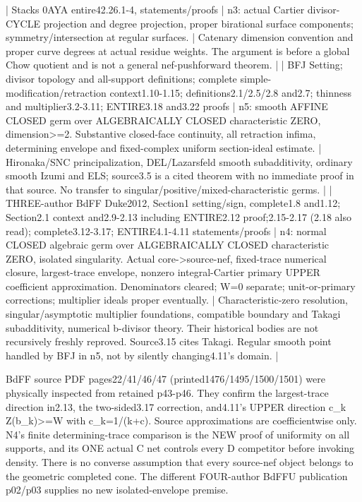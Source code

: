 \documentclass[11pt]{article}
\begin{document}
| Stacks 0AYA entire42.26.1-4, statements/proofs | n3: actual Cartier divisor-CYCLE projection and degree projection, proper birational surface components; symmetry/intersection at regular surfaces. | Catenary dimension convention and proper curve degrees at actual residue weights. The argument is before a global Chow quotient and is not a general nef-pushforward theorem. |
| BFJ Setting; divisor topology and all-support definitions; complete simple-modification/retraction context1.10-1.15; definitions2.1/2.5/2.8 and2.7; thinness and multiplier3.2-3.11; ENTIRE3.18 and3.22 proofs | n5: smooth AFFINE CLOSED germ over ALGEBRAICALLY CLOSED characteristic ZERO, dimension>=2. Substantive closed-face continuity, all retraction infima, determining envelope and fixed-complex uniform section-ideal estimate. | Hironaka/SNC principalization, DEL/Lazarsfeld smooth subadditivity, ordinary smooth Izumi and ELS; source3.5 is a cited theorem with no immediate proof in that source. No transfer to singular/positive/mixed-characteristic germs. |
| THREE-author BdFF Duke2012, Section1 setting/sign, complete1.8 and1.12; Section2.1 context and2.9-2.13 including ENTIRE2.12 proof;2.15-2.17 (2.18 also read); complete3.12-3.17; ENTIRE4.1-4.11 statements/proofs | n4: normal CLOSED algebraic germ over ALGEBRAICALLY CLOSED characteristic ZERO, isolated singularity. Actual core->source-nef, fixed-trace numerical closure, largest-trace envelope, nonzero integral-Cartier primary UPPER coefficient approximation. Denominators cleared; W=0 separate; unit-or-primary corrections; multiplier ideals proper eventually. | Characteristic-zero resolution, singular/asymptotic multiplier foundations, compatible boundary and Takagi subadditivity, numerical b-divisor theory. Their historical bodies are not recursively freshly reproved. Source3.15 cites Takagi. Regular smooth point handled by BFJ in n5, not by silently changing4.11's domain. |

BdFF source PDF pages22/41/46/47 (printed1476/1495/1500/1501) were physically inspected from retained p43-p46. They confirm the largest-trace direction in2.13, the two-sided3.17 correction, and4.11's UPPER direction c\_k Z(b\_k)>=W with c\_k=1/(k+c). Source approximations are coefficientwise only. N4's finite determining-trace comparison is the NEW proof of uniformity on all supports, and its ONE actual C net controls every D competitor before invoking density. There is no converse assumption that every source-nef object belongs to the geometric completed cone. The different FOUR-author BdFFU publication p02/p03 supplies no new isolated-envelope premise.
\end{document}
